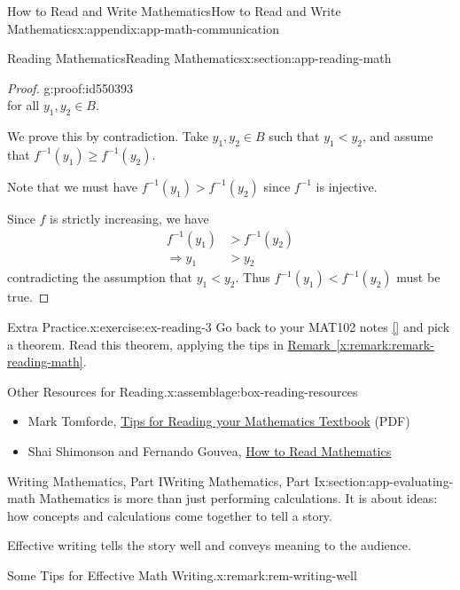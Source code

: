 \documentclass[oneside,10pt,]{book}
\newcommand{\xreffont}{\relax}
\numberwithin{equation}{section}
\newcommand{\lt}{<}
\newcommand{\gt}{>}
\newcommand{\amp}{&}
\begin{document}
\begin{appendixptx}{How to Read and Write Mathematics}{}{How to Read and Write Mathematics}{}{}{x:appendix:app-math-communication}
\begin{sectionptx}{Reading Mathematics}{}{Reading Mathematics}{}{}{x:section:app-reading-math}
\begin{proof}{}{g:proof:id550393}
\begin{equation*}
\end{equation*}
for all \(y_1,y_2 \in B\).%
\par
We prove this by contradiction. Take \(y_1,y_2 \in B\) such that \(y_1 \lt y_2\), and assume that \(f^{-1}(y_1) \geq f^{-1}(y_2)\).%
\par
Note that we must have \(f^{-1}(y_1) > f^{-1}(y_2)\) since \(f^{-1}\) is injective.%
\par
Since \(f\) is strictly increasing, we have%
\begin{align*}
f^{-1}(y_1) \amp \gt f^{-1}(y_2) \\
\Rightarrow y_1 \amp \gt y_2
\end{align*}
contradicting the assumption that \(y_1 \lt y_2\). Thus \(f^{-1}(y_1) \lt f^{-1}(y_2)\) must be true.%
\end{proof}
\begin{inlineexercise}{Extra Practice.}{x:exercise:ex-reading-3}%
Go back to your MAT102 notes \hyperlink{x:biblio:bib-fuchs-102}{[{\xreffont 3}]} and pick a theorem. Read this theorem, applying the tips in \hyperref[x:remark:remark-reading-math]{Remark~{\xreffont\ref{x:remark:remark-reading-math}}}.%
\end{inlineexercise}%
\begin{assemblage}{Other Resources for Reading.}{x:assemblage:box-reading-resources}%
%
\begin{itemize}[label=\textbullet]
\item{}Mark Tomforde, \href{https://marktomforde.com/academic/mathmajors/images/MathReadingTips.pdf}{Tips for Reading your Mathematics Textbook} (PDF)%
\item{}Shai Shimonson and Fernando Gouvea, \href{https://web.stonehill.edu/compsci/History_Math/math-read.htm}{How to Read Mathematics}%
\end{itemize}
%
\end{assemblage}
\end{sectionptx}
%
%
\typeout{************************************************}
\typeout{************************************************}
%
\begin{sectionptx}{Writing Mathematics, Part I}{}{Writing Mathematics, Part I}{}{}{x:section:app-evaluating-math}
Mathematics is more than just performing calculations. It is about ideas: how concepts and calculations come together to tell a story.%
\par
Effective writing tells the story well and conveys meaning to the audience.%
\begin{remark}{Some Tips for Effective Math Writing.}{x:remark:rem-writing-well}%

\end{remark}
\end{sectionptx}
\end{appendixptx}
\end{document}

